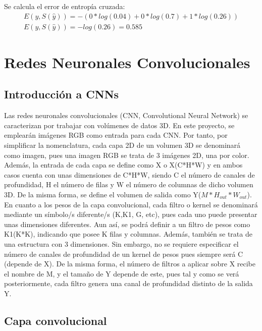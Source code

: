Se calcula el error de entropía cruzada: \\

\begin{gather}
	 E(y, S(\hat{y})) = - (0*log(0.04) + 0*log(0.7) + 1*log(0.26)) \\
	 E(y, S(\hat{y})) = -log(0.26) = 0.585
\end{gather}

\cite{Cross_entropy_backprop}

\section{Redes Neuronales Convolucionales}

\subsection{Introducción a CNNs}

Las redes neuronales convolucionales (CNN, Convolutional Neural Network) se caracterizan por trabajar con volúmenes de datos 3D. En este proyecto, se emplearán imágenes RGB como entrada para cada CNN. Por tanto, por simplificar la nomenclatura, cada capa 2D de un volumen 3D se denominará como imagen, pues una imagen RGB se trata de 3 imágenes 2D, una por color. Además, la entrada de cada capa se define como X o X(C*H*W) y en ambos casos cuenta con unas dimensiones de C*H*W, siendo C el número de canales de profundidad, H el número de filas y W el número de columnas de dicho volumen 3D. De la misma forma, se define el volumen de salida como Y($M*H_{out}*W_{out}$). En cuanto a los pesos de la capa convolucional, cada filtro o kernel se denominará mediante un símbolo/s diferente/s (K,K1, G, etc), pues cada uno puede presentar unas dimensiones diferentes. Aun así, se podrá definir a un filtro de pesos como K1(K*K), indicando que posee K filas y columnas. Además, también se trata de una estructura con 3 dimensiones. Sin embargo, no se requiere especificar el número de canales de profundidad de un kernel de pesos pues siempre será C (depende de X). De la misma forma, el número de filtros a aplicar sobre X recibe el nombre de M, y el tamaño de Y depende de este, pues tal y como se verá posteriormente, cada filtro genera una canal de profundidad distinto de la salida Y. 

\subsection{Capa convolucional}

